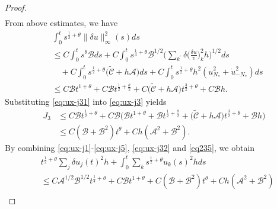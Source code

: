 \documentclass[10pt,a4paper]{amsart}
\begin{document}
\begin{proof}
\begin{equation}
\begin{aligned}
\end{aligned}	
\end{equation}
From above estimates, we have
\begin{equation}\label{eq:ux-j31}
\begin{aligned}
&\int_{0}^{t}s^{\frac12+\theta}\|\delta u\|_{\infty}^2(s)ds\\
&\leq C\int_{0}^{t}s^{\theta}\mathscr{B}ds+C\int_{0}^{t}s^{\frac14+\theta}\mathscr{B}^{1/2}\Big(\sum_{k^{\prime}}\delta\big(\frac{\delta u}{v}\big)_{k}^{2}h\Big)^{1/2}ds\\
&\quad+C\int_{0}^{t}s^{\frac12+\theta}\big(\tilde{\mathscr{C}}+ h\mathscr{A}\big)ds+C\int_{0}^{t}s^{\frac12+\theta}h^{2}(\dot{u}_{N_* }^{2}+\dot{u}_{-N_* }^{2})ds\\
&\leq C\mathscr{B}t^{1+\theta}+C\mathscr{B}t^{\frac12+\frac\theta 2}+C\big(\tilde{\mathscr{C}}+ h\mathscr{A}\big)t^{\frac32+\theta}+C\mathscr{B}h.
\end{aligned}	
\end{equation}
Substituting \eqref{eq:ux-j31} into \eqref{eq:ux-j3} yields
\begin{equation}\label{eq:ux-j32}
\begin{aligned}
J_3&\leq  C\mathscr{B}t^{\frac{1}{2}+\theta}+C\mathscr{B}\Big(\mathscr{B}t^{1+\theta}+\mathscr{B}t^{\frac12+\frac\theta 2}+\big(\tilde{\mathscr{C}}+ h\mathscr{A}\big)t^{\frac32+\theta}+\mathscr{B}h\Big)\\
&\leq  C(\mathscr{B}+\mathscr{B}^2)t^{\theta}+C h(\mathscr{A}^2+\mathscr{B}^2).
\end{aligned}	
\end{equation}
By combining \eqref{eq:ux-j1}-\eqref{eq:ux-j5}, \eqref{eq:ux-j32} and \eqref{eq235}, we obtain
\begin{equation}\label{eq236}\begin{aligned}
&t^{\frac{1}{2}+\theta}\sum_{j}\delta u_{j}(t)^{2}h+\int_{0}^{t}\sum_{k}s^{\frac{1}{2}+\theta}\dot{u}_{k}(s)^{2}hds \\
&\leq C\mathscr{A}^{1/2}\mathscr{B}^{1/2}t^{\frac{1}{4}+\theta}+C\mathscr{B}t^{1+\theta}+C(\mathscr{B}+\mathscr{B}^2)t^{\theta}+C h(\mathscr{A}^2+\mathscr{B}^2)\\

\end{aligned}
\end{equation}
\end{proof}
\end{document}

